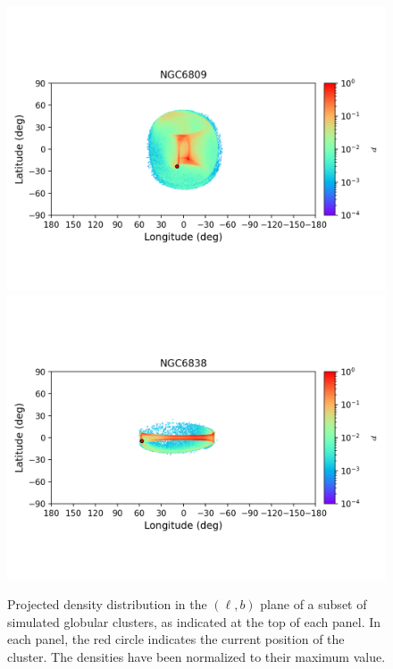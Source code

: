 \begin{figure}
\begin{center}
                \includegraphics[clip=true, trim = 0mm 20mm 0mm 10mm, width=1\columnwidth]{images/error_plots_NGC6809.png}
                \includegraphics[clip=true, trim = 0mm 20mm 0mm 10mm, width=1\columnwidth]{images/error_plots_NGC6838.png}
            \end{center}
            \caption[]{Projected density distribution in the $(\ell, b)$ plane of a subset of simulated globular clusters, as indicated at the top of each panel. In each panel, the red circle indicates the current position of the cluster. The densities have been normalized to their maximum value.}\label{stream15}
        \end{figure}
        
